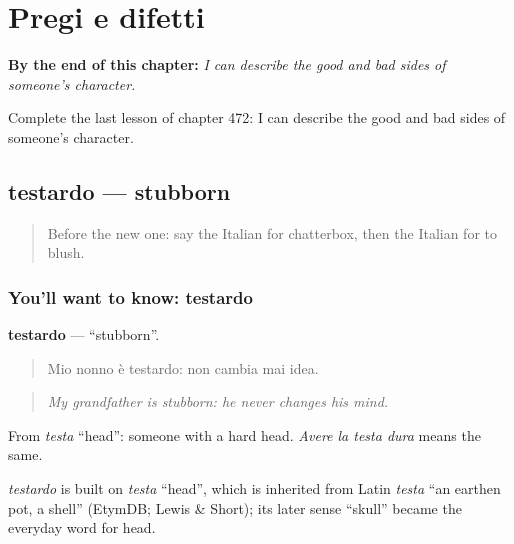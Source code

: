 
\chapter{Pregi e difetti}
\label{ch:it-pregi-e-difetti}

\begin{chapteropening}
\textbf{By the end of this chapter:} \emph{I can describe the good and bad sides of someone's character.}

Complete the last lesson of chapter 472: I can describe the good and bad sides of someone's character.
\end{chapteropening}

\section[testardo]{testardo — stubborn}

\label{lesson:IT-C472-testardo}



\begin{quote}
Before the new one: say the Italian for chatterbox, then the Italian for to blush.
\end{quote}

\subsection*{You'll want to know: testardo}
\textbf{testardo} — \textquotedblleft{}stubborn\textquotedblright{}.

\begin{quote}
Mio nonno è testardo: non cambia mai idea.
\end{quote}

\begin{quote}
\emph{My grandfather is stubborn: he never changes his mind.}
\end{quote}

From \emph{testa} \textquotedblleft{}head\textquotedblright{}: someone with a hard head. \emph{Avere la testa dura} means the same.

\begin{cousinweb}
\emph{testardo} is built on \emph{testa} \textquotedblleft{}head\textquotedblright{}, which is inherited from Latin \emph{testa} \textquotedblleft{}an earthen pot, a shell\textquotedblright{} (EtymDB; Lewis \& Short); its later sense \textquotedblleft{}skull\textquotedblright{} became the everyday word for head.
\end{cousinweb}

